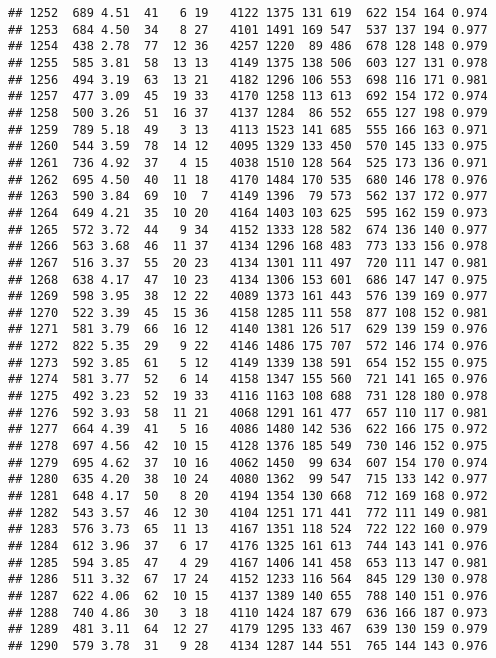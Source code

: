 \documentclass[]{article}
\begin{document}
\begin{verbatim}
## 1252  689 4.51  41   6 19   4122 1375 131 619  622 154 164 0.974
## 1253  684 4.50  34   8 27   4101 1491 169 547  537 137 194 0.977
## 1254  438 2.78  77  12 36   4257 1220  89 486  678 128 148 0.979
## 1255  585 3.81  58  13 13   4149 1375 138 506  603 127 131 0.978
## 1256  494 3.19  63  13 21   4182 1296 106 553  698 116 171 0.981
## 1257  477 3.09  45  19 33   4170 1258 113 613  692 154 172 0.974
## 1258  500 3.26  51  16 37   4137 1284  86 552  655 127 198 0.979
## 1259  789 5.18  49   3 13   4113 1523 141 685  555 166 163 0.971
## 1260  544 3.59  78  14 12   4095 1329 133 450  570 145 133 0.975
## 1261  736 4.92  37   4 15   4038 1510 128 564  525 173 136 0.971
## 1262  695 4.50  40  11 18   4170 1484 170 535  680 146 178 0.976
## 1263  590 3.84  69  10  7   4149 1396  79 573  562 137 172 0.977
## 1264  649 4.21  35  10 20   4164 1403 103 625  595 162 159 0.973
## 1265  572 3.72  44   9 34   4152 1333 128 582  674 136 140 0.977
## 1266  563 3.68  46  11 37   4134 1296 168 483  773 133 156 0.978
## 1267  516 3.37  55  20 23   4134 1301 111 497  720 111 147 0.981
## 1268  638 4.17  47  10 23   4134 1306 153 601  686 147 147 0.975
## 1269  598 3.95  38  12 22   4089 1373 161 443  576 139 169 0.977
## 1270  522 3.39  45  15 36   4158 1285 111 558  877 108 152 0.981
## 1271  581 3.79  66  16 12   4140 1381 126 517  629 139 159 0.976
## 1272  822 5.35  29   9 22   4146 1486 175 707  572 146 174 0.976
## 1273  592 3.85  61   5 12   4149 1339 138 591  654 152 155 0.975
## 1274  581 3.77  52   6 14   4158 1347 155 560  721 141 165 0.976
## 1275  492 3.23  52  19 33   4116 1163 108 688  731 128 180 0.978
## 1276  592 3.93  58  11 21   4068 1291 161 477  657 110 117 0.981
## 1277  664 4.39  41   5 16   4086 1480 142 536  622 166 175 0.972
## 1278  697 4.56  42  10 15   4128 1376 185 549  730 146 152 0.975
## 1279  695 4.62  37  10 16   4062 1450  99 634  607 154 170 0.974
## 1280  635 4.20  38  10 24   4080 1362  99 547  715 133 142 0.977
## 1281  648 4.17  50   8 20   4194 1354 130 668  712 169 168 0.972
## 1282  543 3.57  46  12 30   4104 1251 171 441  772 111 149 0.981
## 1283  576 3.73  65  11 13   4167 1351 118 524  722 122 160 0.979
## 1284  612 3.96  37   6 17   4176 1325 161 613  744 143 141 0.976
## 1285  594 3.85  47   4 29   4167 1406 141 458  653 113 147 0.981
## 1286  511 3.32  67  17 24   4152 1233 116 564  845 129 130 0.978
## 1287  622 4.06  62  10 15   4137 1389 140 655  788 140 151 0.976
## 1288  740 4.86  30   3 18   4110 1424 187 679  636 166 187 0.973
## 1289  481 3.11  64  12 27   4179 1295 133 467  639 130 159 0.979
## 1290  579 3.78  31   9 28   4134 1287 144 551  765 144 143 0.976

\end{verbatim}
\end{document}

